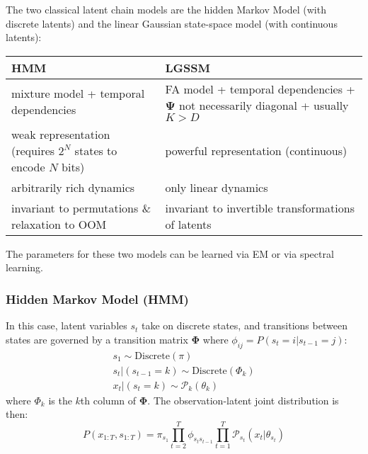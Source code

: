 \documentclass[a4paper]{article}
\begin{document}
The two classical latent chain models are the hidden Markov Model (with discrete latents) and the linear Gaussian state-space model (with continuous latents): 
\begin{table}[H]
\centering
\begin{tabular}{p{7cm}|p{7cm}}
HMM & LGSSM \\\hline
mixture model + temporal dependencies & FA model + temporal dependencies + $\mathbf{\Psi}$ not necessarily diagonal + usually $K > D$ \\
weak representation (requires $2^N$ states to encode $N$ bits) & powerful representation (continuous) \\
arbitrarily rich dynamics & only linear dynamics \\
invariant to permutations \& relaxation to OOM & invariant to invertible transformations of latents \\
\end{tabular}
\end{table}
The parameters for these two models can be learned via EM or via spectral learning.

\subsubsection{Hidden Markov Model (HMM)}
In this case, latent variables $s_t$ take on discrete states, and transitions between states are governed by a transition matrix $\mathbf{\Phi}$ where $\phi_{ij} = P(s_t = i|s_{t-1} = j)$:
\begin{gather*}
s_1 \sim \textrm{Discrete}(\pi) \\
s_t|(s_{t-1} = k) \sim \textrm{Discrete}(\Phi_k) \\
x_t|(s_t = k) \sim \mathcal{P}_k(\theta_k)
\end{gather*}
where $\Phi_k$ is the $k$th column of $\mathbf{\Phi}$. The observation-latent joint distribution is then:
\[ P(x_{1:T},s_{1:T}) = \pi_{s_1}\prod_{t=2}^T \phi_{s_ts_{t-1}} \prod_{t=1}^T \mathcal{P}_{s_t}(x_t|\theta_{s_t}) \]
\end{document}
